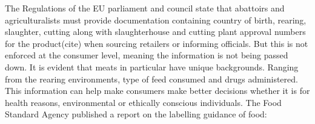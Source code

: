 \documentclass[a4paper, 11pt]{article}
\begin{document}
The Regulations of the EU parliament and council state that abattoirs and agriculturalists must provide documentation containing country of birth, rearing, slaughter, cutting along with slaughterhouse and cutting plant approval numbers for the product(cite) when sourcing retailers or informing officials. But this is not enforced at the consumer level, meaning the information is not being passed down. It is evident that meats in particular have unique backgrounds. Ranging from the rearing environments, type of feed consumed and drugs administered. This information can help make consumers make better decisions whether it is for health reasons, environmental or ethically conscious individuals. The Food Standard Agency published a report on the labelling guidance of food:

\vspace{\baselineskip}
\end{document}

